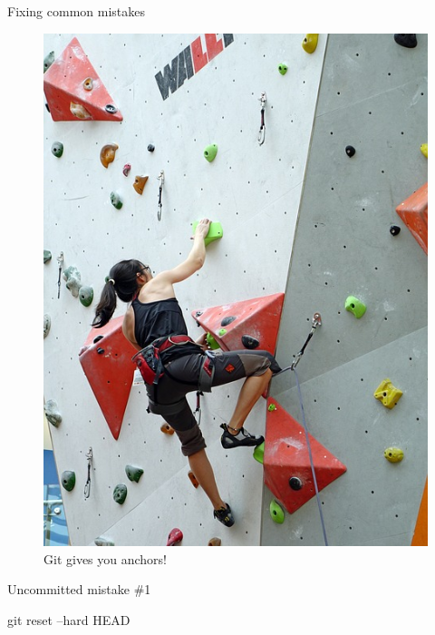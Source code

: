 \begin{frame}{Fixing common mistakes}
  \begin{figure}
    \includegraphics[scale=0.35]{climbing-756669_640.jpg}
    \\ Git gives you anchors!
  \end{figure}
\end{frame}

\begin{frame}[fragile]{Uncommitted mistake \#1}

  \color{ucMaroon}{I screwed everything up but didn't commit. How do I return
  to my most recent commit?}

  \qquad

  \begin{gitCommand}git reset --hard HEAD\end{gitCommand}
\end{frame}

